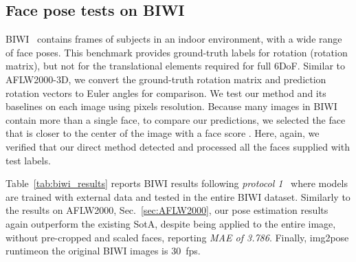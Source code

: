 \documentclass[final]{cvpr}
\newcommand{\minisection}[1]{\vspace{1mm}\noindent{\textbf{#1}.}}
\begin{document}
\subsection{Face pose tests on BIWI}\label{sec:BIWI}
BIWI~\cite{biwi} contains  frames of  subjects in an indoor environment, with a wide range of face poses. 
This benchmark provides ground-truth labels for rotation (rotation matrix), but not for the translational elements required for full 6DoF.
Similar to AFLW2000-3D, we convert the ground-truth rotation matrix and prediction rotation vectors to Euler angles for comparison.
We test our method and its baselines on each image using  pixels resolution. Because many images in BIWI contain more than a single face, to compare our predictions, we selected the face that is closer to the center of the image with a face score . Here, again, we verified that our direct method detected and processed all the faces supplied with test labels. 

\minisection{BIWI face pose results} Table~\ref{tab:biwi_results} reports BIWI results following {\em protocol 1}~\cite{hopenet, fsanet} where models are trained with external data and tested in the entire BIWI dataset. Similarly to the results on AFLW2000, Sec.~\ref{sec:AFLW2000}, our pose estimation results again outperform the existing SotA, despite being applied to the entire image, without pre-cropped and scaled faces, reporting {\em MAE of 3.786}. Finally, img2pose runtimeon the original  BIWI images is 30~fps.
\end{document}
